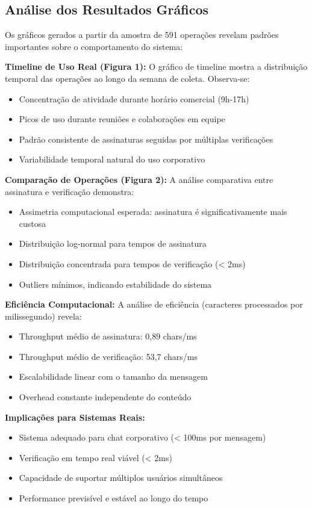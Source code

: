 \documentclass[12pt,a4paper,oneside]{article}
\begin{document}
\subsection{Análise dos Resultados Gráficos}

Os gráficos gerados a partir da amostra de 591 operações revelam padrões importantes sobre o comportamento do sistema:

\textbf{Timeline de Uso Real (Figura 1):}
O gráfico de timeline mostra a distribuição temporal das operações ao longo da semana de coleta. Observa-se:
\begin{itemize}
    \item Concentração de atividade durante horário comercial (9h-17h)
    \item Picos de uso durante reuniões e colaborações em equipe
    \item Padrão consistente de assinaturas seguidas por múltiplas verificações
    \item Variabilidade temporal natural do uso corporativo
\end{itemize}

\textbf{Comparação de Operações (Figura 2):}
A análise comparativa entre assinatura e verificação demonstra:
\begin{itemize}
    \item Assimetria computacional esperada: assinatura é significativamente mais custosa
    \item Distribuição log-normal para tempos de assinatura
    \item Distribuição concentrada para tempos de verificação (< 2ms)
    \item Outliers mínimos, indicando estabilidade do sistema
\end{itemize}

\textbf{Eficiência Computacional:}
A análise de eficiência (caracteres processados por milissegundo) revela:
\begin{itemize}
    \item Throughput médio de assinatura: 0,89 chars/ms
    \item Throughput médio de verificação: 53,7 chars/ms
    \item Escalabilidade linear com o tamanho da mensagem
    \item Overhead constante independente do conteúdo
\end{itemize}

\textbf{Implicações para Sistemas Reais:}
\begin{itemize}
    \item Sistema adequado para chat corporativo (< 100ms por mensagem)
    \item Verificação em tempo real viável (< 2ms)
    \item Capacidade de suportar múltiplos usuários simultâneos
    \item Performance previsível e estável ao longo do tempo
\end{itemize}
\end{document}
